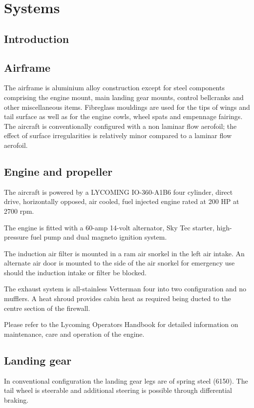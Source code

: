 \chapter{Systems}
\thispagestyle{fancy}
\minitoc[n] %

\section{Introduction}


\section{Airframe}
The airframe is aluminium alloy construction except for steel components comprising the engine mount, main
landing gear mounts, control bellcranks and other miscellaneous items. Fibreglass mouldings are used for the
tips of wings and tail surface as well as for the engine cowls, wheel spats and empennage fairings.
The aircraft is conventionally configured with a non laminar flow aerofoil; the effect of surface irregularities is
relatively minor compared to a laminar flow aerofoil.

\section{Engine and propeller}
The aircraft is powered by a LYCOMING IO-360-A1B6 four cylinder, direct drive, horizontally opposed, air cooled, fuel injected engine rated at 200 HP at 2700 rpm. 

The engine is fitted with a 60-amp 14-volt alternator,
Sky Tec starter, high-pressure fuel pump and dual magneto ignition system. 

The induction air filter is mounted in
a ram air snorkel in the left air intake. An alternate air door is mounted to the side of the air snorkel for emergency
use should the induction intake or filter be blocked.

The exhaust system is all-stainless Vetterman four into two configuration and no mufflers. A heat shroud provides cabin
heat as required being ducted to the centre section of the firewall.

Please refer to the Lycoming Operators Handbook for detailed information on maintenance, care and operation
of the engine.

\section{Landing gear}
In conventional configuration the landing gear legs are of spring steel (6150).%
The tail wheel is steerable and additional steering is possible through differential braking.

